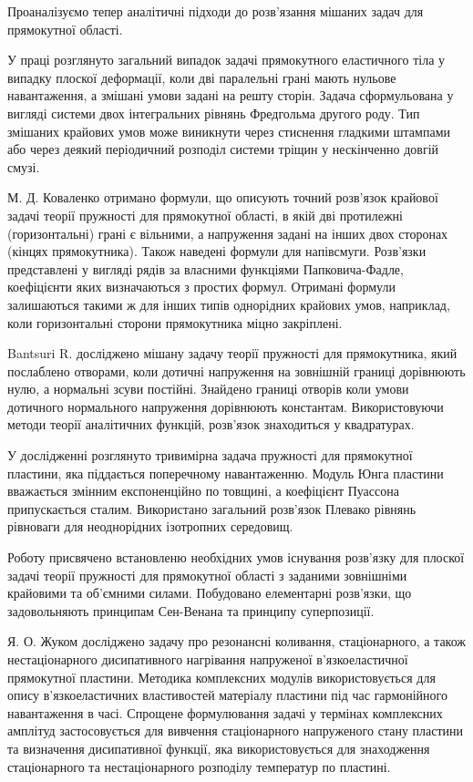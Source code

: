 Проаналізуємо тепер аналітичні підходи до розв'язання мішаних задач для прямокутної області.

У праці \cite{shyam_1} розглянуто загальний випадок задачі прямокутного еластичного тіла у випадку плоскої деформації,
коли дві паралельні грані мають нульове навантаження, а змішані умови задані на решту сторін.
Задача сформульована у вигляді системи двох інтегральних рівнянь Фредгольма другого роду.
Тип змішаних крайових умов може виникнути через стиснення гладкими штампами або через деякий періодичний розподіл системи тріщин у нескінченно довгій смузі.

М. Д. Коваленко \cite{kovalenko_1} отримано формули, що описують точний розв'язок крайової задачі теорії пружності для прямокутної області,
в якій дві протилежні (горизонтальні) грані є вільними, а напруження задані на інших двох сторонах (кінцях прямокутника).
Також наведені формули для напівсмуги. Розв'язки представлені у вигляді рядів за власними функціями Папковича-Фадле, коефіцієнти яких визначаються з простих формул.
Отримані формули залишаються такими ж для інших типів однорідних крайових умов, наприклад,
коли горизонтальні сторони прямокутника міцно закріплені.

Bantsuri R. \cite{bantsuri_1} досліджено мішану задачу теорії пружності для прямокутника, який послаблено отворами,
коли дотичні напруження на зовнішній границі дорівнюють нулю, а нормальні зсуви постійні.
Знайдено границі отворів коли умови дотичного нормального напруження дорівнюють константам.
Використовуючи методи теорії аналітичних функцій, розв'язок знаходиться у квадратурах.

У дослідженні \cite{kashtalyan_1} розглянуто тривимірна задача пружності для прямокутної пластини,
яка піддається поперечному навантаженню.
Модуль Юнга пластини вважається змінним експоненційно по товщині, а коефіцієнт Пуассона припускається сталим.
Використано загальний розв'язок Плевако рівнянь рівноваги для неоднорідних ізотропних середовищ.

Роботу \cite{vihak_2} присвячено встановленю необхідних умов існування розв'язку для плоскої задачі теорії пружності для прямокутної області
з заданими зовнішніми крайовими та об'ємними силами.
Побудовано елементарні розв'язки, що задовольняють принципам Сен-Венана та принципу суперпозиції.

Я. О. Жуком \cite{zhuk_1} досліджено задачу про резонансні коливання, стаціонарного, а також нестаціонарного дисипативного нагрівання
напруженої в'язкоеластичної прямокутної пластини.
Методика комплексних модулів використовується для опису в'язкоеластичних властивостей матеріалу пластини під час гармонійного навантаження в часі.
Спрощене формулювання задачі у термінах комплексних амплітуд застосовується для вивчення стаціонарного напруженого стану пластини та визначення дисипативної функції,
яка використовується для знаходження стаціонарного та нестаціонарного розподілу температур по пластині.

